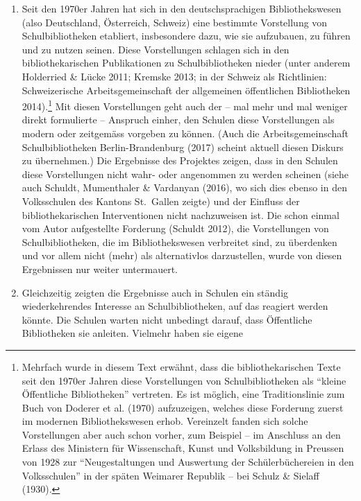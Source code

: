 \documentclass[a4paper,
fontsize=11pt,
oneside,
numbers=noperiodatend,
parskip=half-,
bibliography=totoc,
final
]{scrartcl}
\begin{document}
\begin{enumerate}
\def\labelenumi{\arabic{enumi}.}
\item
  Seit den 1970er Jahren hat sich in den deutschsprachigen
  Bibliothekswesen (also Deutschland, Österreich, Schweiz) eine
  bestimmte Vorstellung von Schulbibliotheken etabliert, insbesondere
  dazu, wie sie aufzubauen, zu führen und zu nutzen seinen. Diese
  Vorstellungen schlagen sich in den bibliothekarischen Publikationen zu
  Schulbibliotheken nieder (unter anderem Holderried \& Lücke 2011;
  Kremske 2013; in der Schweiz als Richtlinien: Schweizerische
  Arbeitsgemeinschaft der allgemeinen öffentlichen Bibliotheken
  2014).\footnote{Mehrfach wurde in diesem Text erwähnt, dass die
    bibliothekarischen Texte seit den 1970er Jahren diese Vorstellungen
    von Schulbibliotheken als \enquote{kleine Öffentliche Bibliotheken}
    vertreten. Es ist möglich, eine Traditionslinie zum Buch von Doderer
    et al. (1970) aufzuzeigen, welches diese Forderung zuerst im
    modernen Bibliothekswesen erhob. Vereinzelt fanden sich solche
    Vorstellungen aber auch schon vorher, zum Beispiel -- im Anschluss
    an den Erlass des Ministern für Wissenschaft, Kunst und Volksbildung
    in Preussen von 1928 zur \enquote{Neugestaltungen und Auswertung der
    Schülerbüchereien in den Volksschulen} in der späten Weimarer
    Republik -- bei Schulz \& Sielaff (1930).} Mit diesen Vorstellungen
  geht auch der -- mal mehr und mal weniger direkt formulierte --
  Anspruch einher, den Schulen diese Vorstellungen als modern oder
  zeitgemäss vorgeben zu können. (Auch die Arbeitsgemeinschaft
  Schulbibliotheken Berlin-Brandenburg (2017) scheint aktuell diesen
  Diskurs zu übernehmen.) Die Ergebnisse des Projektes zeigen, dass in
  den Schulen diese Vorstellungen nicht wahr- oder angenommen zu werden
  scheinen (siehe auch Schuldt, Mumenthaler \& Vardanyan (2016), wo sich
  dies ebenso in den Volksschulen des Kantons St.~Gallen zeigte) und der
  Einfluss der bibliothekarischen Interventionen nicht nachzuweisen ist.
  Die schon einmal vom Autor aufgestellte Forderung (Schuldt 2012), die
  Vorstellungen von Schulbibliotheken, die im Bibliothekswesen
  verbreitet sind, zu überdenken und vor allem nicht (mehr) als
  alternativlos darzustellen, wurde von diesen Ergebnissen nur weiter
  untermauert.
\item
  Gleichzeitig zeigten die Ergebnisse auch in Schulen ein ständig
  wiederkehrendes Interesse an Schulbibliotheken, auf das reagiert
  werden könnte. Die Schulen warten nicht unbedingt darauf, dass
  Öffentliche Bibliotheken sie anleiten. Vielmehr haben sie eigene

\end{enumerate}
\end{document}
